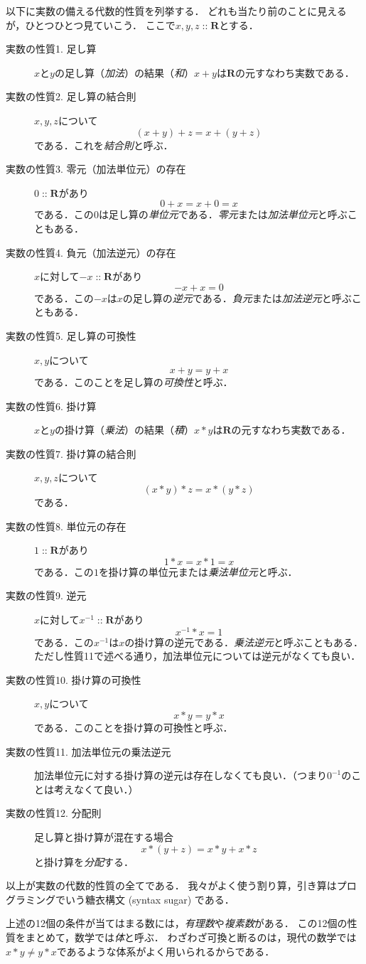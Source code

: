 \documentclass[twocolumn]{jsbook}
\newcommand{\mathIn}[1]{\mathop{::}#1}
\newcommand{\mathSet}[1]{\mathbf{#1}}
\newcommand{\keyword}[1]{\emph{#1}}
\begin{document}
以下に実数の備える代数的性質を列挙する．
どれも当たり前のことに見えるが，ひとつひとつ見ていこう．
ここで$x,y,z\mathIn\mathSet{R}$とする．
\begin{description}
\item[実数の性質1. 足し算] $x$と$y$の足し算（\keyword{加法}）の結果（\keyword{和}）$x+y$は$\mathSet{R}$の元すなわち実数である．
\item[実数の性質2. 足し算の結合則] $x,y,z$について$$(x+y)+z=x+(y+z)$$である．これを\keyword{結合則}と呼ぶ．
\item[実数の性質3. 零元（加法単位元）の存在] $0\mathIn\mathSet{R}$があり$$0+x=x+0=x$$である．この$0$は足し算の\keyword{単位元}である．\keyword{零元}または\keyword{加法単位元}と呼ぶこともある．
\item[実数の性質4. 負元（加法逆元）の存在] $x$に対して$-x\mathIn\mathSet{R}$があり$$-x+x=0$$である．この$-x$は$x$の足し算の\keyword{逆元}である．\keyword{負元}または\keyword{加法逆元}と呼ぶこともある．
\item[実数の性質5. 足し算の可換性] $x,y$について$$x+y=y+x$$である．このことを足し算の\keyword{可換性}と呼ぶ．
\item[実数の性質6. 掛け算] $x$と$y$の掛け算（\keyword{乗法}）の結果（\keyword{積}）$x*y$は$\mathSet{R}$の元すなわち実数である．
\item[実数の性質7. 掛け算の結合則] $x,y,z$について$$(x*y)*z=x*(y*z)$$である．
\item[実数の性質8. 単位元の存在] $1\mathIn\mathSet{R}$があり$$1*x=x*1=x$$である．この$1$を掛け算の単位元または\keyword{乗法単位元}と呼ぶ．
\item[実数の性質9. 逆元] $x$に対して$x^{-1}\mathIn\mathSet{R}$があり$$x^{-1}*x=1$$である．この$x^{-1}$は$x$の掛け算の逆元である．\keyword{乗法逆元}と呼ぶこともある．ただし性質11で述べる通り，加法単位元については逆元がなくても良い．
\item[実数の性質10. 掛け算の可換性] $x,y$について$$x*y=y*x$$である．このことを掛け算の可換性と呼ぶ．
\item[実数の性質11. 加法単位元の乗法逆元] 加法単位元に対する掛け算の逆元は存在しなくても良い．（つまり$0^{-1}$のことは考えなくて良い．）
\item[実数の性質12. 分配則] 足し算と掛け算が混在する場合$$x*(y+z)=x*y+x*z$$と掛け算を\keyword{分配}する．
\end{description}
以上が実数の代数的性質の全てである．
我々がよく使う割り算，引き算はプログラミングでいう糖衣構文 (syntax sugar) である．

上述の12個の条件が当てはまる数には，\keyword{有理数}や\keyword{複素数}がある．
この12個の性質をまとめて，数学では\keyword{体}と呼ぶ．
わざわざ可換と断るのは，現代の数学では$x*y\neq y*x$であるような体系がよく用いられるからである．
\end{document}
